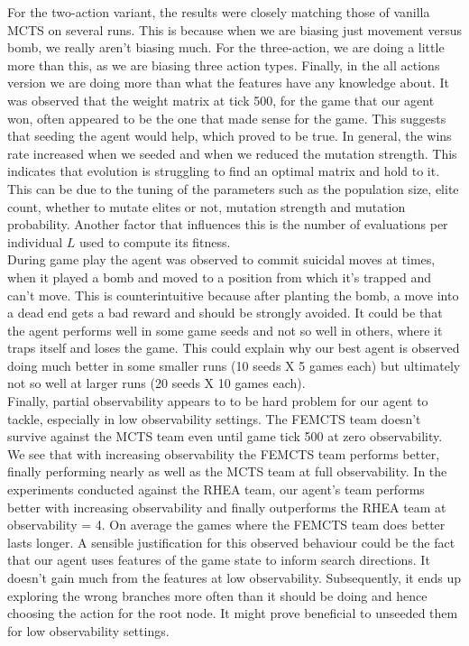 \documentclass{llncs}
\begin{document}
\noindent
For the two-action variant, the results were closely matching those of vanilla MCTS on several runs. This is because when we are biasing just movement versus bomb, we really aren't biasing much. For the three-action, we are doing a little more than this, as we are biasing three action types. Finally, in the all actions version we are doing more than what the features have any knowledge about. It was observed that the weight matrix at tick 500, for the game that our agent won, often appeared to be the one that made sense for the game. This suggests that seeding the agent would help, which proved to be true. In general, the wins rate increased when we seeded and when we reduced the mutation strength. This indicates that evolution is struggling to find an optimal matrix and hold to it. This can be due to the tuning of the parameters such as the population size, elite count, whether to mutate elites or not, mutation strength and mutation probability. Another factor that influences this is the number of evaluations per individual $L$ used to compute its fitness. \\

\noindent
During game play the agent was observed to commit suicidal moves at times, when it played a bomb and moved to a position from which it’s trapped and can't move. This is counterintuitive because after planting the bomb, a move into a dead end gets a bad reward and should be strongly avoided. It could be that the agent performs well in some game seeds and not so well in others, where it traps itself and loses the game. This could explain why our best agent is observed doing much better in some smaller runs (10 seeds X 5 games each) but ultimately not so well at larger runs (20 seeds X 10 games each).\\

\noindent
Finally, partial observability appears to to be hard problem for our agent to tackle, especially in low observability settings. The FEMCTS team doesn't survive against the MCTS team even until game tick 500 at zero observability. We see that with increasing observability the FEMCTS team performs better, finally performing nearly as well as the MCTS team at full observability. In the experiments conducted against the RHEA team, our agent's team performs better with increasing observability and finally outperforms the RHEA team at observability = 4. On average the games where the FEMCTS team does better lasts longer. A sensible justification for this observed behaviour could be the fact that our agent uses features of the game state to inform search directions. It doesn't gain much from the features at low observability. Subsequently, it ends up exploring the wrong branches more often than it should be doing and hence choosing the action for the root node. It might prove beneficial to unseeded them for low observability settings.
\end{document}

